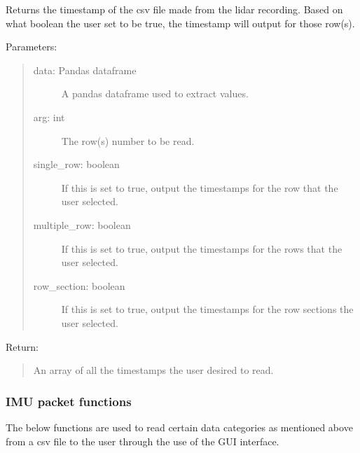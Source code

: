 \documentclass[letterpaper,10pt,english]{sphinxmanual}
\begin{document}
\begin{fulllineitems}
\label{\detokenize{Lidar extraction tool:lidar_extract.get_timestamp}}
Returns the timestamp of the csv file made from the lidar recording. Based on what boolean the user set to be true,
the timestamp will output for those row(s).

Parameters:
\begin{quote}
\begin{description}
\item[{data: Pandas dataframe}] \leavevmode
A pandas dataframe used to extract values.

\item[{arg: int}] \leavevmode
The row(s) number to be read.

\item[{single\_row: boolean}] \leavevmode
If this is set to true, output the timestamps for the row that the user selected.

\item[{multiple\_row: boolean}] \leavevmode
If this is set to true, output the timestamps for the rows that the user selected.

\item[{row\_section: boolean}] \leavevmode
If this is set to true, output the timestamps for the row sections the user selected.

\end{description}
\end{quote}

Return:
\begin{quote}

An array of all the timestamps the user desired to read.
\end{quote}

\end{fulllineitems}



\subsubsection{IMU packet functions}
\label{\detokenize{Lidar extraction tool:imu-packet-functions}}
The below functions are used to read certain data categories as mentioned above from a csv file to the user through the use of the GUI interface.
\end{document}
